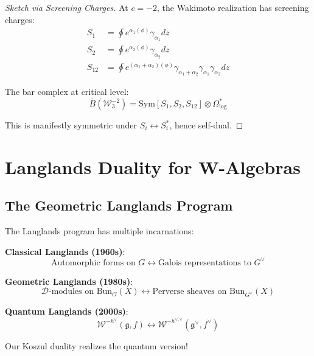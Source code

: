 \begin{proof}[Sketch via Screening Charges]
At $c = -2$, the Wakimoto realization has screening charges:
\begin{align}
S_1 &= \oint e^{\alpha_1(\phi)} \gamma_{\alpha_1} dz \\
S_2 &= \oint e^{\alpha_2(\phi)} \gamma_{\alpha_2} dz \\
S_{12} &= \oint e^{(\alpha_1+\alpha_2)(\phi)} \gamma_{\alpha_1+\alpha_2} \gamma_{\alpha_1}\gamma_{\alpha_2} dz
\end{align}

The bar complex at critical level:
\begin{equation}
\bar{B}(\mathcal{W}_3^{-2}) = \mathrm{Sym}[S_1, S_2, S_{12}] \otimes \Omega^*_{\log}
\end{equation}

This is manifestly symmetric under $S_i \leftrightarrow S_i^*$, hence self-dual.
\end{proof}

\section{Langlands Duality for W-Algebras}

\subsection{The Geometric Langlands Program}

\begin{context}
The Langlands program has multiple incarnations:

\textbf{Classical Langlands (1960s)}: 
\begin{equation}
\text{Automorphic forms on } G \longleftrightarrow \text{Galois representations to } G^\vee
\end{equation}

\textbf{Geometric Langlands (1980s)}: 
\begin{equation}
\mathcal{D}\text{-modules on } \mathrm{Bun}_G(X) \longleftrightarrow \text{Perverse sheaves on } \mathrm{Bun}_{G^\vee}(X)
\end{equation}

\textbf{Quantum Langlands (2000s)}: 
\begin{equation}
\mathcal{W}^{-h^\vee}(\mathfrak{g}, f) \longleftrightarrow \mathcal{W}^{-h^{\vee,\vee}}(\mathfrak{g}^\vee, f^\vee)
\end{equation}

Our Koszul duality realizes the quantum version!
\end{context}

